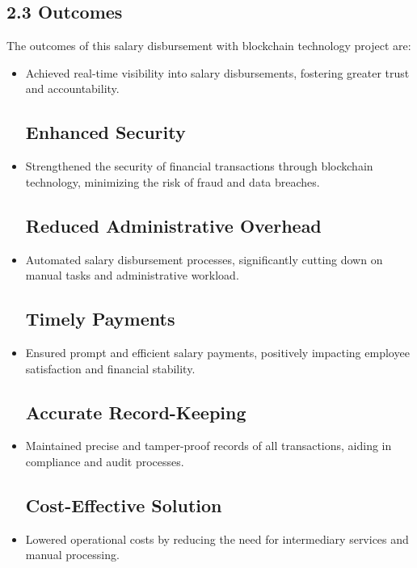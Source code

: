 \documentclass[12pt]{report}
\begin{document}
\subsection*{2.3 Outcomes}
\begin{center}    
    \justify
The outcomes of this salary disbursement with blockchain technology project are:
\begin{itemize}
    \subsection*{Increased Transparency}
    \item Achieved real-time visibility into salary disbursements, fostering greater trust and accountability.

    \subsection*{Enhanced Security}
    \item Strengthened the security of financial transactions through blockchain technology, minimizing the risk of fraud and data breaches.

    \subsection*{Reduced Administrative Overhead}
    \item Automated salary disbursement processes, significantly cutting down on manual tasks and administrative workload.

    \subsection*{Timely Payments}
    \item Ensured prompt and efficient salary payments, positively impacting employee satisfaction and financial stability.

    \subsection*{Accurate Record-Keeping}
    \item Maintained precise and tamper-proof records of all transactions, aiding in compliance and audit processes.

    \subsection*{Cost-Effective Solution}
    \item Lowered operational costs by reducing the need for intermediary services and manual processing.


\end{itemize}
\end{center}
\end{document}
